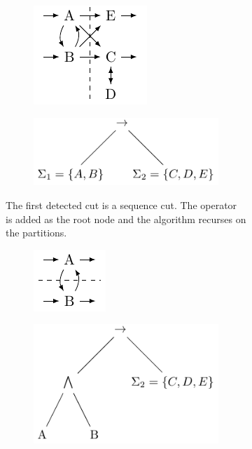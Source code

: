 \documentclass[
	a4paper,
	pagesize,
	pdftex,
	12pt,
	twoside, %
	BCOR=5mm, %
	ngerman,
	fleqn,
	final,
	]{scrartcl}
\begin{document}
\begin{figure}
\begin{subfigure}[t]{\textwidth}
 \begin{subfigure}[t]{0.5\textwidth}
 \centering
 \includegraphics[width=0.5\linewidth]{img/IMExample_initial.pdf}
 \end{subfigure}
 \begin{subfigure}[t]{0.5\textwidth}
  \includegraphics[width=0.9\linewidth]{img/sequence_tree.pdf}
 \end{subfigure}
 \caption{The first detected cut is a sequence cut. The operator is added as the root node and the algorithm recurses on the partitions.}
\end{subfigure}
\begin{subfigure}[t]{\textwidth}
 \begin{subfigure}[t]{0.5\textwidth}
  \centering
  \includegraphics[width=0.3\linewidth]{img/IMExample_and.pdf}
 \end{subfigure}
 \begin{subfigure}[t]{0.5\textwidth}
   \centering
   \includegraphics[width=0.5\linewidth]{img/and_tree.pdf}

\end{subfigure}
\end{subfigure}
\end{figure}
\end{document}
